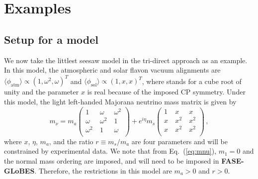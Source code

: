 \documentclass[a4paper,11pt]{article}
\begin{document}
\section{Examples}
\subsection{Setup for a model}
We now take the littlest seesaw model in the tri-direct approach as an example. In this model, the atmospheric and solar flavon vacuum alignments are $\langle\phi_{\text{atm}}\rangle\propto\left(1, \omega^2, \omega\right)^T$ and $\langle\phi_{\text{sol}}\rangle\propto\left(1, x, x\right)^T$,
where  stands for a cube root of unity and the parameter $x$ is real because of the imposed CP symmetry. Under this model, the light left-handed Majorana neutrino mass matrix is given by
\begin{equation}
\label{eq:mnu}  m_{\nu}=m_{a}\begin{pmatrix}
 1 &~ \omega  &~ \omega ^2 \\
 \omega  &~ \omega ^2 &~ 1 \\
 \omega ^2 &~ 1 &~ \omega  \\
\end{pmatrix}+e^{i\eta}m_{s}
\begin{pmatrix}
 1 &~  x &~  x \\
 x &~ x^2 &~ x^2 \\
 x &~ x^2 &~ x^2 \\
\end{pmatrix}\,,
\end{equation}
where $x$, $\eta$, $m_a$, and the ratio $r\equiv m_s/m_a$ are four parameters and will be constrained by experimental data. We note that from Eq.~(\ref{eq:mnu}), $m_1=0$ and the normal mass ordering are imposed, and will need to be imposed in \textbf{FASE-GLoBES}. Therefore, the restrictions in this model are $m_a>0$ and $r>0$.
\end{document}
